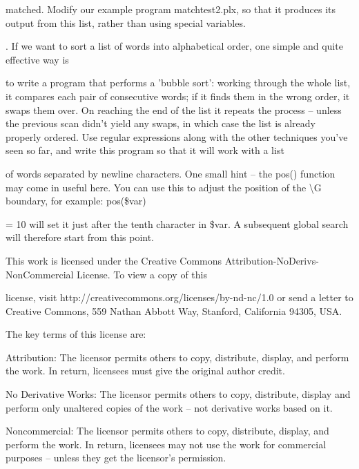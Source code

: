 \documentclass[a4paper,11pt]{book}
\begin{document}
\noindent matched. Modify our example program matchtest2.plx, so that it produces its output from this list, rather than using special variables.

\noindent 

.   If we want to sort a list of words into alphabetical order, one simple and quite effective way is

\noindent to write a program that performs a 'bubble sort': working through the whole list, it compares each pair of consecutive words; if it finds them in the wrong order, it swaps them over. On reaching the end of the list it repeats the process -- unless the previous scan didn't yield any swaps, in which case the list is already properly ordered. Use regular expressions along with the other techniques you've seen so far, and write this program so that it will work with a list

\noindent of words separated by newline characters. One small hint -- the pos() function may come in useful here. You can use this to adjust the position of the \textbackslash G boundary, for example: pos(\$var)

\noindent = 10 will set it just after the tenth character in \$var. A subsequent global search will therefore start from this point.

\noindent  

\noindent  

\noindent  

\noindent  

\noindent 

\noindent 

\noindent 

\noindent This work is licensed under the Creative Commons Attribution-NoDerivs-NonCommercial License. To view a copy of this

\noindent license, visit http://creativecommons.org/licenses/by-nd-nc/1.0 or send a letter to Creative Commons, 559 Nathan Abbott Way, Stanford, California 94305, USA.

\noindent 

\noindent The key terms of this license are:

\noindent 

\noindent Attribution: The licensor permits others to copy, distribute, display, and perform the work. In return, licensees must give the original author credit.

\noindent 

\noindent No  Derivative  Works: The licensor permits others to copy, distribute, display and perform only unaltered copies of the work -- not derivative works based on it.

\noindent 

\noindent Noncommercial: The licensor permits others to copy, distribute, display, and perform the work. In return, licensees may not use the work for commercial purposes -- unless they get the licensor's permission.
\end{document}
